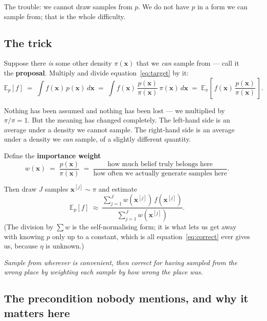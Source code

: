 \documentclass[11pt,a4paper]{report}
\newcommand{\term}[1]{\textcolor{rust}{\textbf{#1}}}
\newcommand{\xt}{\mathbf{x}}
\begin{document}
The trouble: we cannot draw samples from $p$. We do not have $p$ in a form we
can sample from; that is the whole difficulty.

\subsection{The trick}

Suppose there \emph{is} some other density $\pi(\xt)$ that we \emph{can}
sample from --- call it the \term{proposal}. Multiply and divide
equation~\eqref{eq:target} by it:
\begin{equation}
\mathbb{E}_p[f]
\;=\; \int f(\xt)\, p(\xt)\, d\xt
\;=\; \int f(\xt)\, \frac{p(\xt)}{\pi(\xt)}\, \pi(\xt)\, d\xt
\;=\; \mathbb{E}_{\pi}\!\left[\, f(\xt)\, \frac{p(\xt)}{\pi(\xt)} \,\right].
\label{eq:importance}
\end{equation}

Nothing has been assumed and nothing has been lost --- we multiplied by
$\pi/\pi = 1$. But the meaning has changed completely. The left-hand side is
an average under a density we cannot sample. The right-hand side is an average
under a density we \emph{can} sample, of a slightly different quantity.

Define the \term{importance weight}
\begin{equation}
w(\xt) \;=\; \frac{p(\xt)}{\pi(\xt)}
\;=\; \frac{\text{how much belief truly belongs here}}
            {\text{how often we actually generate samples here}} .
\label{eq:weightdef}
\end{equation}

Then draw $J$ samples $\xt^{[j]} \sim \pi$ and estimate
\begin{equation}
\mathbb{E}_p[f] \;\approx\;
\frac{\sum_{j=1}^{J} w(\xt^{[j]})\, f(\xt^{[j]})}
     {\sum_{j=1}^{J} w(\xt^{[j]})} .
\label{eq:selfnorm}
\end{equation}
(The division by $\sum w$ is the self-normalising form; it is what lets us get
away with knowing $p$ only up to a constant, which is all
equation~\eqref{eq:correct} ever gives us, because $\eta$ is unknown.)

\begin{keyidea}
\emph{Sample from wherever is convenient, then correct for having sampled from
the wrong place by weighting each sample by how wrong the place was.}
\end{keyidea}

\subsection{The precondition nobody mentions, and why it matters here}
\end{document}
